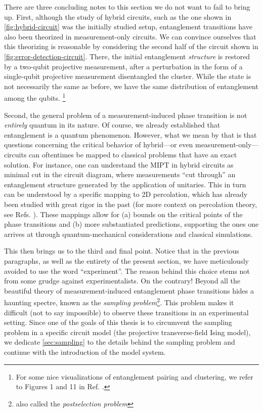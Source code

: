 There are three concluding notes to this section we do not want to fail to
bring up. First, although the study of hybrid circuits, such as the one shown
in \cref{fig:hybrid-circuit} was the initially studied setup, entanglement
transitions have also been theorized in measurement-only circuits. We can
convince ourselves that this theorizing is reasonable by considering the second half
of the circuit shown in \cref{fig:error-detection-circuit}. There, the initial
entanglement \emph{structure} is restored by a two-qubit projective
measurement, after a perturbation in the form of a single-qubit projective
measurement disentangled the cluster. While the state is not necessarily the
same as before, we have the same distribution of entanglement among the qubits.
\footnote{For some nice visualizations of entanglement pairing and clustering, we refer
to Figures 1 and 11 in Ref.
\cite{nahumEntanglementDynamicsDiffusionannihilation2020}.}

Second, the general problem of a measurement-induced phase transition is not
\emph{entirely} quantum in its nature. Of course, we already established that
entanglement is a quantum phenomenon. However, what we mean by that is that
questions concerning the critical behavior of hybrid---or even
measurement-only---circuits can oftentimes be mapped to classical problems that
have an exact solution. For instance, one can understand the MIPT in hybrid
circuits as minimal cut in the circuit diagram, where measurements \enquote{cut
through} an entanglement structure generated by the application of unitaries.
This in turn can be understood by a specific mapping to 2D percolation, which
has already been studied with great rigor in the past (for more context on
percolation theory, see Refs.
\cite{cardyNumberIncipientSpanning1998,cardyCriticalPercolationFinite1992,rudnickBondPercolationFinite1986,aharonyIntroductionPercolationTheory2017}).
These mappings allow for (a) bounds on the critical points of the phase
transitions and (b) more substantiated predictions, supporting the ones one
arrives at through quantum-mechanical considerations and classical simulations.

This then brings us to the third and final point. Notice that in the previous
paragraphs, as well as the entirety of the present section, we have
meticulously avoided to use the word \enquote{experiment}. The reason behind
this choice stems not from some grudge against experimentalists. On the
contrary! Beyond all the beautiful theory of measurement-induced entanglement
phase transitions hides a haunting spectre, known as the \emph{sampling
problem}\footnote{also called the \emph{postselection problem}}. This problem
makes it difficult (not to say impossible) to observe these transitions in an
experimental setting. Since one of the goals of this thesis is to
circumvent the sampling problem in a specific circuit model (the
projective transverse-field Ising model), we dedicate \cref{sec:sampling} to the
details behind the sampling problem and continue with the introduction of the
model system.


